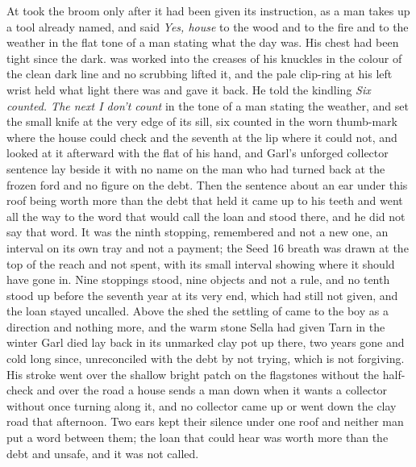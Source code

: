 At   took the broom only after it had been given its instruction, as a man takes up a tool already named, and said \emph{Yes, house} to the wood and to the fire and to the weather in the flat tone of a man stating what the day was. His chest had been tight since the dark.  was worked into the creases of his knuckles in the colour of the clean dark line and no scrubbing lifted it, and the pale clip-ring at his left wrist held what light there was and gave it back. He told the kindling \emph{Six counted. The next I don't count} in the tone of a man stating the weather, and set the small knife at the very edge of its sill, six counted in the worn thumb-mark where the house could check and the seventh at the lip where it could not, and looked at it afterward with the flat of his hand, and Garl's unforged collector sentence lay beside it with no name on the man who had turned back at the frozen ford and no figure on the debt. Then the sentence about an ear under this roof being worth more than the debt that held it came up to his teeth and went all the way to the word that would call the loan and stood there, and he did not say that word. It was the ninth stopping, remembered and not a new one, an interval on its own tray and not a payment; the Seed 16 breath was drawn at the top of the reach and not spent, with its small interval showing where it should have gone in. Nine stoppings stood, nine objects and not a rule, and no tenth stood up before the seventh year at its very end, which had still not given, and the loan stayed uncalled. Above the shed the settling of  came to the boy as a direction and nothing more, and the warm stone Sella had given Tarn in the winter Garl died lay back in its unmarked clay pot up there, two years gone and cold long since, unreconciled with the debt by not trying, which is not forgiving. His stroke went over the shallow bright patch on the flagstones without the half-check and over the road a house sends a man down when it wants a collector without once turning along it, and no collector came up or went down the clay road that afternoon. Two ears kept their silence under one roof and neither man put a word between them; the loan that could hear was worth more than the debt and unsafe, and it was not called.

\scenebreak

